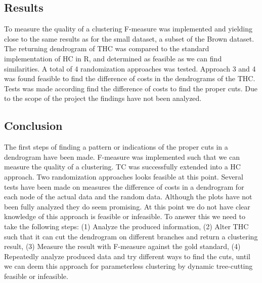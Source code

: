 \documentclass[a4paper,10pt]{article}
\theoremstyle{plain}
\theoremstyle{definition}
\begin{document}
\subsection*{Results}
To measure the quality of a clustering F-measure was implemented and yielding close to the same results as \cite{clustEval} for the small dataset, a subset of the Brown dataset. The returning dendrogram of THC was compared to the standard implementation of HC in R, and determined as feasible as we can find similarities. A total of 4 randomization approaches was tested. Approach 3 and 4 was found feasible to find the difference of costs in the dendrograms of the THC. Tests was made according find the difference of costs to find the proper cuts. Due to the scope of the project the findings have not been analyzed.

\subsection*{Conclusion}
The first steps of finding a pattern or indications of the proper cuts in a dendrogram have been made. F-measure was implemented such that we can measure the quality of a clustering. TC was successfully extended into a HC approach. Two randomization approaches looks feasible at this point. Several tests have been made on measures the difference of costs in a dendrogram for each node of the actual data and the random data. Although the plots have not been fully analyzed they do seem promising. At this point we do not have clear knowledge of this approach is feasible or infeasible. To answer this we need to take the following steps: (1) Analyze the produced information, (2) Alter THC such that it can cut the dendrogram on different branches and return a clustering result, (3) Measure the result with F-measure against the gold standard, (4) Repeatedly analyze produced data and try different ways to find the cuts, until we can deem this approach for parameterless clustering by dynamic tree-cutting feasible or infeasible.

\newpage
\end{document}

